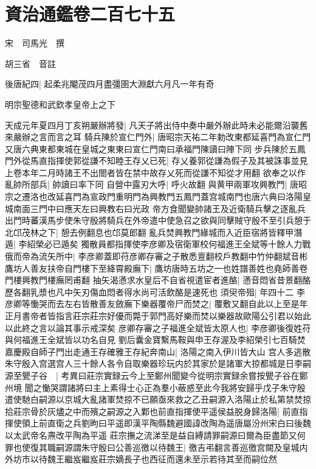 \chapter{資治通鑑卷二百七十五}
宋　司馬光　撰

胡三省　音註

後唐紀四|{
	起柔兆閹茂四月盡彊圉大淵獻六月凡一年有奇}


明宗聖德和武欽孝皇帝上之下

天成元年夏四月丁亥朔嚴辦將發|{
	凡天子將出侍中奏中嚴外辦此時未必能爾沿襲舊來嚴辦之言而言之耳}
騎兵陳於宣仁門外|{
	唐昭宗天祐二年勅改東都延喜門為宣仁門又唐六典東都東城在皇城之東東曰宣仁門南曰承福門陳讀曰陣下同}
步兵陳於五鳳門外從馬直指揮使郭從謙不知睦王存乂已死|{
	存乂養郭從謙為假子及其被誅事並見上卷本年二月時諸王不出閤者皆在禁中故存乂死而從謙不知從才用翻}
欲奉之以作亂帥所部兵|{
	帥讀曰率下同}
自營中露刃大呼|{
	呼火故翻}
與黄甲兩軍攻興教門|{
	唐昭宗之遷洛也改延喜門為宣政門重明門為興教門五鳳門蓋宫城南門也唐六典曰洛陽皇城南面三門中曰應天左曰興教右曰光政}
帝方食聞變帥諸王及近衛騎兵擊之逐亂兵出門時蕃漢馬步使朱守殷將騎兵在外帝遣中使急召之欲與同擊賊守殷不至引兵憩于北邙茂林之下|{
	憩去例翻息也邙莫郎翻}
亂兵焚興教門緣城而入近臣宿將皆釋甲潛遁|{
	李紹榮必已遁矣}
獨散員都指揮使李彦卿及宿衛軍校何福進王全斌等十餘人力戰俄而帝為流矢所中|{
	李彦卿蓋即苻彦卿存審之子散悉亶翻校戶教翻中竹仲翻斌音彬}
鷹坊人善友扶帝自門樓下至絳霄殿廡下|{
	鷹坊唐時五坊之一也姓譜善姓也堯師善卷門樓興教門樓廡罔甫翻}
抽矢渴懣求水皇后不自省視遣宦者進酪|{
	懣音悶省昔景翻酪歷各翻乳漿也凡中矢刃傷血悶者得水尚可活飲酪是速死也}
須臾帝殂|{
	年四十二}
李彦卿等慟哭而去左右皆散善友斂廡下樂器覆帝尸而焚之|{
	覆敷又翻自此以上至是年正月書帝者皆指言莊宗莊宗好優而斃于郭門高好樂而焚以樂器故歐陽公引君以始此以此終之言以論其事示戒深矣}
彦卿存審之子福進全斌皆太原人也|{
	李彦卿後復姓苻與何福進王全斌皆以功名自見}
劉后囊金寶繫馬鞍與申王存渥及李紹榮引七百騎焚嘉慶殿自師子門出走通王存確雅王存紀奔南山|{
	洛陽之南入伊川皆大山}
宫人多逃散朱守殷入宫選宫人三十餘人各令自取樂器珍玩内於其家於是諸軍大掠都城是日李嗣源至甖子谷　|{
	考異曰莊宗實録云今上至鄭州聞變今從明宗實録余嘗按甖子谷在鄭州境}
聞之慟哭謂諸將曰主上素得士心正為羣小蔽惑至此今我將安歸乎戊子朱守殷遣使馳白嗣源以京城大亂諸軍焚掠不已願亟來救之乙丑嗣源入洛陽止於私第禁焚掠拾莊宗骨於灰燼之中而殯之嗣源之入鄴也前直指揮使平遥侯益脱身歸洛陽|{
	前直指揮使領上前直衛之兵劉昫曰平遥即漢平陶縣魏避國諱改陶為遥唐屬汾州宋白曰後魏以太武帝名燾改平陶為平遥}
莊宗撫之流涕至是益自縛請罪嗣源曰爾為臣盡節又何罪也使復其職嗣源謂朱守殷曰公善巡徼以待魏王|{
	徼吉弔翻言善巡徼宫闕及皇城内外坊市以待魏王繼岌繼岌莊宗嫡長子也西征而還未至示若待其至而嗣位然}
